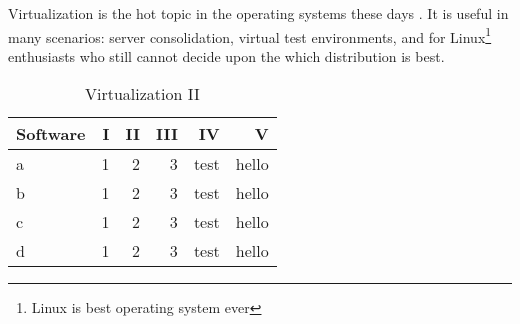   \noindent Virtualization is the hot topic in the operating systems 
  these days \cite{google} \cite{linux} \cite{xen}. It is useful in many scenarios: server consolidation,
  virtual test environments, and for Linux\footnote{Linux is best operating system ever} enthusiasts who
  still cannot decide upon the which distribution is best.
  \begin{table}[ht]
  \centering
  \begin{tabular}{l r r r r r}
  \hline
  Software & I & II & III & IV & V\\[0.4ex]
  \hline
  a & 1 & 2 & 3 & test & hello\\
  b & 1 & 2 & 3 & test & hello\\
  c & 1 & 2 & 3 & test & hello\\
  d & 1 & 2 & 3 & test & hello\\
  \hline
  \end{tabular}
  \caption{Virtualization II}

 \end{table}
%

